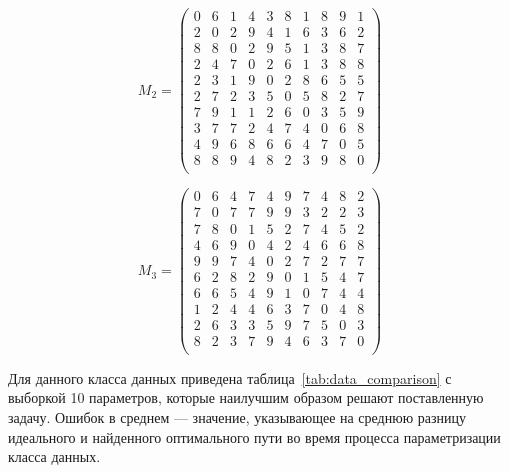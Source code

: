 \begin{equation}
	\label{eq:new_matrix2}
	M_{2} = \begin{pmatrix}
		0 & 6 & 1 & 4 & 3 & 8 & 1 & 8 & 9 & 1 \\
		2 & 0 & 2 & 9 & 4 & 1 & 6 & 3 & 6 & 2 \\
		8 & 8 & 0 & 2 & 9 & 5 & 1 & 3 & 8 & 7 \\
		2 & 4 & 7 & 0 & 2 & 6 & 1 & 3 & 8 & 8 \\
		2 & 3 & 1 & 9 & 0 & 2 & 8 & 6 & 5 & 5 \\
		2 & 7 & 2 & 3 & 5 & 0 & 5 & 8 & 2 & 7 \\
		7 & 9 & 1 & 1 & 2 & 6 & 0 & 3 & 5 & 9 \\
		3 & 7 & 7 & 2 & 4 & 7 & 4 & 0 & 6 & 8 \\
		4 & 9 & 6 & 8 & 6 & 6 & 4 & 7 & 0 & 5 \\
		8 & 8 & 9 & 4 & 8 & 2 & 3 & 9 & 8 & 0 \\
	\end{pmatrix}
\end{equation}

\begin{equation}
	\label{eq:new_matrix3}
	M_{3} = \begin{pmatrix}
		0 & 6 & 4 & 7 & 4 & 9 & 7 & 4 & 8 & 2 \\
		7 & 0 & 7 & 7 & 9 & 9 & 3 & 2 & 2 & 3 \\
		7 & 8 & 0 & 1 & 5 & 2 & 7 & 4 & 5 & 2 \\
		4 & 6 & 9 & 0 & 4 & 2 & 4 & 6 & 6 & 8 \\
		9 & 9 & 7 & 4 & 0 & 2 & 7 & 2 & 7 & 7 \\
		6 & 2 & 8 & 2 & 9 & 0 & 1 & 5 & 4 & 7 \\
		6 & 6 & 5 & 4 & 9 & 1 & 0 & 7 & 4 & 4 \\
		1 & 2 & 4 & 4 & 6 & 3 & 7 & 0 & 4 & 8 \\
		2 & 6 & 3 & 3 & 5 & 9 & 7 & 5 & 0 & 3 \\
		8 & 2 & 3 & 7 & 9 & 4 & 6 & 3 & 7 & 0 \\
	\end{pmatrix}
\end{equation}


Для данного класса данных приведена таблица~\ref{tab:data_comparison} с выборкой 10 параметров, которые наилучшим образом решают поставленную задачу.
Ошибок в среднем --- значение, указывающее на среднюю разницу идеального и найденного оптимального пути во время процесса параметризации класса данных.

